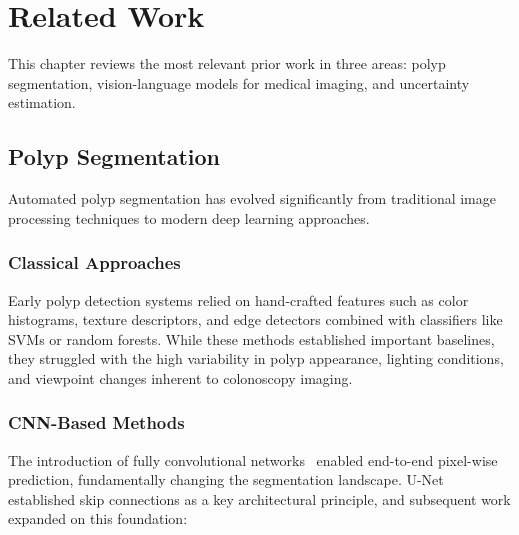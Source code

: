 
\chapter{Related Work}
\label{ch:relatedwork}

This chapter reviews the most relevant prior work in three areas: polyp segmentation, vision-language models for medical imaging, and uncertainty estimation.

\section{Polyp Segmentation}
\label{sec:rw:polypseg}

Automated polyp segmentation has evolved significantly from traditional image processing techniques to modern deep learning approaches.

\subsection{Classical Approaches}
\label{sec:rw:classical}

Early polyp detection systems relied on hand-crafted features such as color histograms, texture descriptors, and edge detectors combined with classifiers like \ac{SVM}s or random forests. While these methods established important baselines, they struggled with the high variability in polyp appearance, lighting conditions, and viewpoint changes inherent to colonoscopy imaging.

\subsection{CNN-Based Methods}
\label{sec:rw:cnn}

The introduction of fully convolutional networks~\cite{long2015fcn} enabled end-to-end pixel-wise prediction, fundamentally changing the segmentation landscape. U-Net~\cite{ronneberger2015unet} established skip connections as a key architectural principle, and subsequent work expanded on this foundation:

